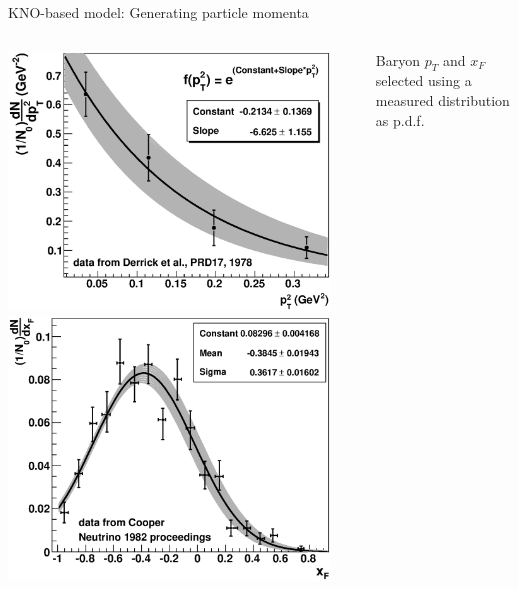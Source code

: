 \begin{frame}{KNO-based model: Generating particle momenta}

\begin{columns}[T]
  \begin{column}{0.40\textwidth}
     \includegraphics[width=0.93\textwidth]{./images/nuint/dis/nucpT2pdf.eps}\\
     \includegraphics[width=0.93\textwidth]{./images/nuint/dis/nucxFpdf.eps}
  \end{column}
  \begin{column}{0.60\textwidth}
      Baryon $p_{T}$ and $x_{F}$ selected using a measured distribution as p.d.f.\\

\end{column}
\end{columns}
\end{frame}
